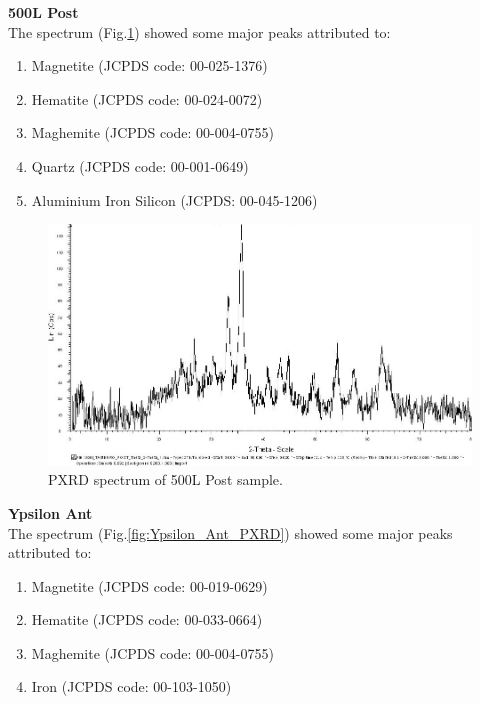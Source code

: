 \textbf{500L Post} \\
The spectrum (Fig.\ref{fig:500L_Post_PXRD}) showed some major peaks attributed to:

\begin{enumerate}[noitemsep]
    \item Magnetite (JCPDS code: 00-025-1376)
    \item Hematite (JCPDS code: 00-024-0072)
    \item Maghemite (JCPDS code: 00-004-0755)
    \item Quartz (JCPDS code: 00-001-0649)
    \item Aluminium Iron Silicon (JCPDS: 00-045-1206)
\end{enumerate}

\begin{figure}[H]
\centering
    \includegraphics[scale=0.46]{images/500L_tamburo_post_edit.jpg}
    \caption{PXRD spectrum of 500L Post sample.}
    \label{fig:500L_Post_PXRD}
\end{figure} 

\textbf{Ypsilon Ant} \\
The spectrum (Fig.\ref{fig:Ypsilon_Ant_PXRD}) showed some major peaks attributed to:

\begin{enumerate}[noitemsep]
    \item Magnetite (JCPDS code: 00-019-0629)
    \item Hematite (JCPDS code: 00-033-0664)
    \item Maghemite (JCPDS code: 00-004-0755)
    \item Iron (JCPDS code: 00-103-1050)
\end{enumerate}

